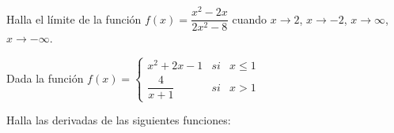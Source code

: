 \documentclass[addpoints,spanish, 12pt,a4paper]{exam}
\begin{document}
\begin{questions}

%
%
%

\question[2] Halla el límite de la función $f(x)=\dfrac{x^2-2x}{2x^2-8}$ cuando $x\to 2$, $x\to -2$, $x\to \infty$, $x\to -\infty$.

\question Dada la función $f(x)=\left\{ \begin{matrix}
x^2+2x-1 &  si & x\leq 1 \\
\dfrac{4}{x+1} &  si & x > 1
\end{matrix}\right.$

\question Halla las derivadas de las siguientes funciones:
 


\end{questions}
\end{document}
